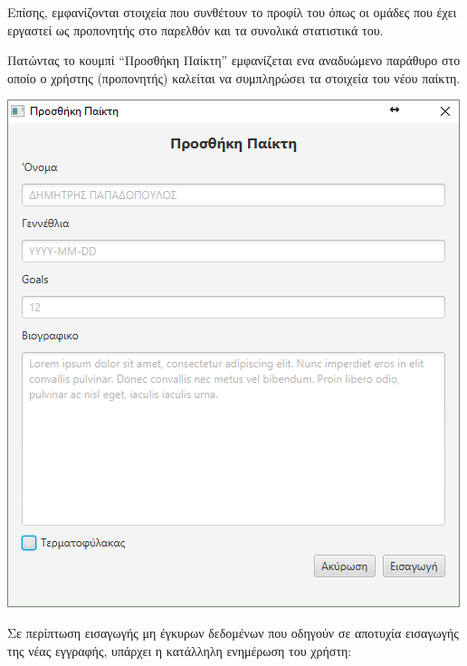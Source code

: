 \documentclass[a4paper,oneside,titlepage,11pt]{article}
\begin{document}
\noindent Επίσης, εμφανίζονται στοιχεία που συνθέτουν το προφίλ του όπως οι ομάδες που έχει εργαστεί ως προπονητής στο παρελθόν και τα συνολικά στατιστικά του.
\vspace{0.3cm}

\noindent Πατώντας το κουμπί ``Προσθήκη Παίκτη'' εμφανίζεται ενα αναδυώμενο παράθυρο στο οποίο ο χρήστης (προπονητής) καλείται να συμπληρώσει τα στοιχεία του νέου παίκτη.

\begin{center}
 \includegraphics[scale=0.76]{screens/4_create.PNG}  
\end{center} 

\noindent Σε περίπτωση εισαγωγής μη έγκυρων δεδομένων που οδηγούν σε αποτυχία εισαγωγής της νέας εγγραφής, υπάρχει η κατάλληλη ενημέρωση του χρήστη:
\end{document}

